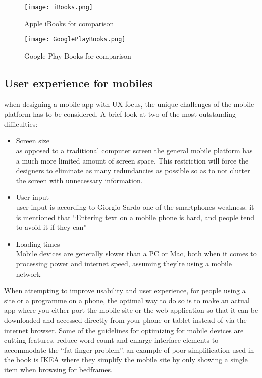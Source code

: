 \begin{figure}[h!]
\centering
\texttt{[image: iBooks.png]}
\caption{Apple iBooks for comparison}
\end{figure}

\begin{figure}[h!]
\centering
\texttt{[image: GooglePlayBooks.png]}
\caption{Google Play Books for comparison}
\end{figure}
\subsection{User experience for mobiles}
when designing a mobile app with UX focus, the unique challenges of the mobile platform has to be considered. A brief look at two of the most outstanding difficulties:
\begin{itemize}
\item Screen size\\
as opposed to a traditional computer screen the general mobile platform has a much more limited amount of screen space. This restriction will force the designers to eliminate as many redundancies as possible so as to not clutter the screen with unnecessary information. \cite{Sardo}
\item User input\\
user input is according to Giorgio Sardo one of  the smartphones weakness. it is mentioned that “Entering text on a mobile phone is hard, and people tend to avoid it if they can”\cite{Sardo}
\item Loading times\\
Mobile devices are generally slower than a PC or Mac, both when it comes to processing power and internet speed, assuming they’re using a mobile network \cite{MobileUsability}
\end{itemize}
When attempting to improve usability and user experience, for people using a site or a programme on a phone, the optimal way to do so is to make an actual app where you either port the mobile site or the web application so that it can be downloaded and accessed directly from your phone or tablet instead of via the internet browser. 
Some of the guidelines for optimizing for mobile devices are cutting features, reduce word count and enlarge interface elements to accommodate the “fat finger problem”.\cite{MobileUsability} an example of poor simplification used in the book is IKEA where they simplify the mobile site by only showing a single item when browsing for bedframes.

